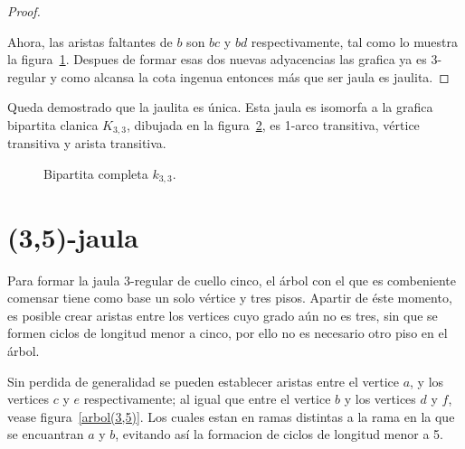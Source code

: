 \documentclass[12pt]{book}
\theoremstyle{definition}
\begin{document}
\begin{proof}
\begin{figure}[htb]
  \caption{} \label{jaula(3,4)}
\end{figure}

Ahora, las aristas faltantes de $b$ son  $bc$
y $bd$ respectivamente, tal como lo muestra la
figura~\ref{jaula(3,4)}. Despues de formar esas dos nuevas adyacencias
las grafica ya es 3-regular y como alcansa la cota ingenua entonces
más que ser jaula es
jaulita.
\end{proof}

Queda demostrado que la jaulita es única. Esta jaula es isomorfa a la
grafica bipartita clanica  $K_{3,3}$,
dibujada en la figura~\ref{K_3,3}, es 1-arco transitiva, vértice
transitiva y arista transitiva.

\begin{figure}[htb]
  \centering
  \caption{Bipartita completa $k_{3,3}$.} \label{K_3,3}
\end{figure}


\section{(3,5)-jaula}

Para formar la jaula $3$-regular de cuello cinco, el árbol con el que
es combeniente comensar tiene como base un solo vértice
y tres pisos. Apartir de éste momento, es posible crear aristas entre
los vertices cuyo grado aún no es tres, sin que se formen ciclos de
longitud menor a cinco, por ello no es necesario otro piso en el árbol.

Sin perdida de generalidad se pueden establecer aristas entre el vertice $a$, y los
vertices $c$ y $e$ respectivamente; al igual que entre el vertice $b$
y los vertices $d$ y $f$, vease figura~\ref{arbol(3,5)}. Los cuales estan en ramas
distintas a la rama en la que se encuantran $a$ y $b$, evitando así la formacion de ciclos de longitud menor a 5.
\end{document}

